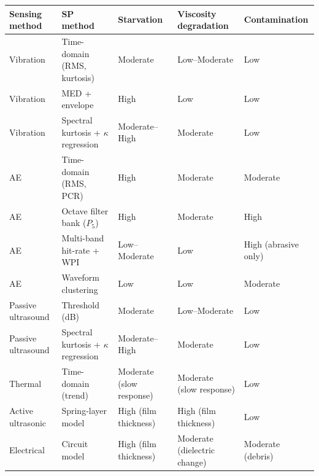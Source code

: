 \begin{table}[H]
\scriptsize
\centering
\renewcommand{\arraystretch}{1.4}
\setlength{\tabcolsep}{4pt}
\begin{tabularx}{\linewidth}{|
>{\raggedright\arraybackslash}p{2.5cm}
| >{\raggedright\arraybackslash}p{2.2cm}
| >{\centering\arraybackslash}X
| >{\centering\arraybackslash}X
| >{\centering\arraybackslash}X |}
\hline
\textbf{Sensing method} & \textbf{SP method} & \textbf{Starvation} & \textbf{Viscosity degradation} & \textbf{Contamination} \\
\hline
Vibration & Time-domain (RMS, kurtosis) & Moderate \cite{jakobsen_detecting_2023,xu_vibration-based_2024} & Low--Moderate \cite{jakobsen_vibration_2021} & Low \\
\hline
Vibration & MED + envelope & High \cite{xu_vibration-based_2024} & Low & Low \\
\hline
Vibration & Spectral kurtosis + $\kappa$ regression & Moderate--High \cite{jakobsen_detecting_2023} & Moderate \cite{jakobsen_detecting_2023} & Low \\
\hline
AE & Time-domain (RMS, PCR) & High \cite{miettinen_analysis_2001,hou_-situ_2025,cornel_condition_2021} & Moderate \cite{cornel_condition_2021} & Moderate \cite{miettinen_analysis_2001} \\
\hline
AE & Octave filter bank ($P_5$) & High \cite{renhart_monitoring_2021} & Moderate & High \cite{renhart_monitoring_2021} \\
\hline
AE & Multi-band hit-rate + WPI & Low--Moderate & Low & High (abrasive only) \cite{scheeren_acoustic_2024,delft_university_of_technology_tu_delft_influence_2024} \\
\hline
AE & Waveform clustering & Low & Low & Moderate \cite{scheeren_acoustic_2024} \\
\hline
Passive ultrasound & Threshold (dB) & Moderate \cite{lineham_ultrasonic_2008} & Low--Moderate & Low \\
\hline
Passive ultrasound & Spectral kurtosis + $\kappa$ regression & Moderate--High \cite{jakobsen_detecting_2023,jakobsen_low_2024} & Moderate & Low \\
\hline
Thermal & Time-domain (trend) & Moderate (slow response) \cite{moussa_passive_2017} & Moderate (slow response) & Low \\
\hline
Active ultrasonic & Spring-layer model & High (film thickness) \cite{chen_evaluation_2023,dwyer-joyce_measurement_2003} & High (film thickness) \cite{chen_evaluation_2023} & Low \\
\hline
Electrical & Circuit model & High (film thickness) \cite{cen_ehl_2021,becker-dombrowsky_electrical_2024} & Moderate (dielectric change) & Moderate (debris) \\

\end{tabularx}
\end{table}
